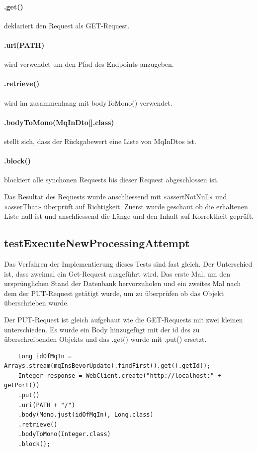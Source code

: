 \paragraph{.get()} deklariert den Request als GET-Request.
\paragraph{.uri(PATH)} wird verwendet um den Pfad des Endpoints anzugeben.
\paragraph{.retrieve()} wird im zusammenhang mit bodyToMono() verwendet.
\paragraph{.bodyToMono(MqInDto[].class)} stellt sich, dass der Rückgabewert eine Liste von MqInDtos ist.
\paragraph{.block()} blockiert alle synchonen Requests bis dieser Request abgeschlossen ist.

Das Resultat des Requests wurde anschliessend mit «assertNotNull» und «asserThat» überprüft auf Richtigkeit. Zuerst wurde geschaut ob die erhaltenen Liste null ist und anschliessend die Länge und den Inhalt auf Korrektheit geprüft.

\subsection{testExecuteNewProcessingAttempt}
Das Verfahren der Implementierung dieses Tests sind fast gleich. Der Unterschied ist, dass zweimal ein Get-Request ausgeführt wird. Das erste Mal, um den ursprünglichen Stand der Datenbank hervorzuholen und ein zweites Mal nach dem der PUT-Request getätigt wurde, um zu überprüfen ob das Objekt überschrieben wurde.

Der PUT-Request ist gleich aufgebaut wie die GET-Requests mit zwei kleinen unterschieden. Es wurde ein Body hinzugefügt mit der id des zu überschreibenden Objekts und das .get() wurde mit .put() ersetzt.

\begin{verbatim}
	Long idOfMqIn = Arrays.stream(mqInsBevorUpdate).findFirst().get().getId();
	Integer response = WebClient.create("http://localhost:" + getPort())
	.put()
	.uri(PATH + "/")
	.body(Mono.just(idOfMqIn), Long.class)
	.retrieve()
	.bodyToMono(Integer.class)
	.block();
\end{verbatim}


